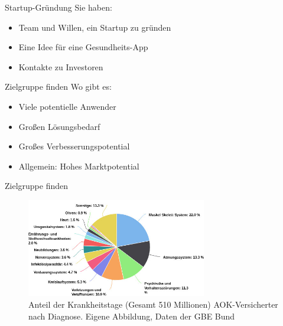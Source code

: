 \documentclass[aspectratio=169,t]{beamer}
\begin{document}
\begin{frame}{Startup-Gründung}
    Sie haben:
    \begin{itemize}
        \item Team und Willen, ein Startup zu gründen
        \item Eine Idee für eine Gesundheits-App
        \item Kontakte zu Investoren
    \end{itemize}
\end{frame}

\begin{frame}{Zielgruppe finden}
    Wo gibt es:
    \begin{itemize}
        \item Viele potentielle Anwender
        \item Großen Lösungsbedarf
        \item Großes Verbesserungspotential
        \item Allgemein: Hohes Marktpotential
    \end{itemize}
\end{frame}

\begin{frame}{Zielgruppe finden}
    \begin{figure}
        \centering
        \includegraphics[width=0.7\textwidth]{Bilder/Krankheitstage.jpg}
        \caption{Anteil der Krankheitstage (Gesamt 510 Millionen) AOK-Versicherter nach Diagnose. Eigene Abbildung, Daten der GBE Bund \cite{GBEKrankheitstage}}
    \end{figure}
\end{frame}
\end{document}
